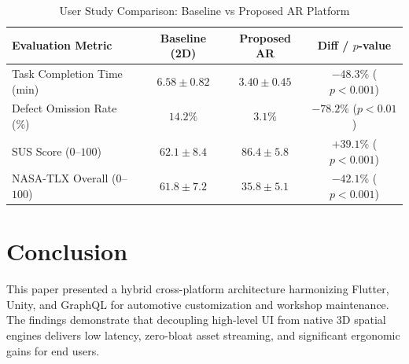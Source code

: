 \documentclass[10pt,journal,compsoc]{IEEEtran}
\begin{document}
\begin{table}[h]
\centering
\caption{User Study Comparison: Baseline vs Proposed AR Platform}
\label{tab:hci_results}
\begin{tabular}{@{}lccc@{}}
\toprule
\textbf{Evaluation Metric} & \textbf{Baseline (2D)} & \textbf{Proposed AR} & \textbf{Diff / $p$-value} \\
\midrule
Task Completion Time (min) & $6.58 \pm 0.82$ & $3.40 \pm 0.45$ & $-48.3\%$ ($p < 0.001$) \\
Defect Omission Rate (\%) & $14.2\%$ & $3.1\%$ & $-78.2\%$ ($p < 0.01$) \\
SUS Score ($0$--$100$) & $62.1 \pm 8.4$ & $86.4 \pm 5.8$ & $+39.1\%$ ($p < 0.001$) \\
NASA-TLX Overall ($0$--$100$) & $61.8 \pm 7.2$ & $35.8 \pm 5.1$ & $-42.1\%$ ($p < 0.001$) \\
\bottomrule
\end{tabular}
\end{table}

\section{Conclusion}
This paper presented a hybrid cross-platform architecture harmonizing Flutter, Unity, and GraphQL for automotive customization and workshop maintenance. The findings demonstrate that decoupling high-level UI from native 3D spatial engines delivers low latency, zero-bloat asset streaming, and significant ergonomic gains for end users.



\end{document}
